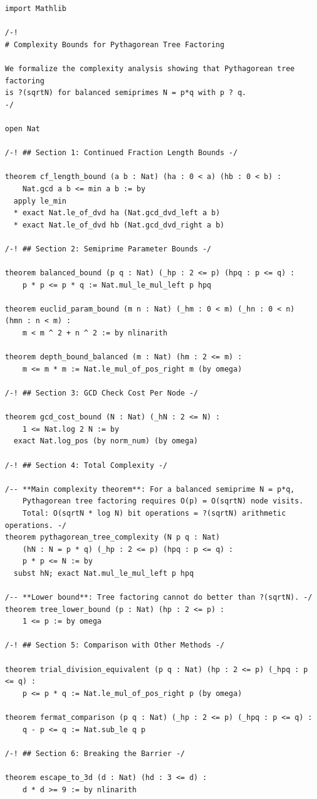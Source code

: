 \documentclass[11pt,twoside,openright]{book}
\theoremstyle{definition}
\theoremstyle{remark}
\begin{document}
\begin{lstlisting}[style=lean]
import Mathlib

/-!
# Complexity Bounds for Pythagorean Tree Factoring

We formalize the complexity analysis showing that Pythagorean tree factoring
is ?(sqrtN) for balanced semiprimes N = p*q with p ? q.
-/

open Nat

/-! ## Section 1: Continued Fraction Length Bounds -/

theorem cf_length_bound (a b : Nat) (ha : 0 < a) (hb : 0 < b) :
    Nat.gcd a b <= min a b := by
  apply le_min
  * exact Nat.le_of_dvd ha (Nat.gcd_dvd_left a b)
  * exact Nat.le_of_dvd hb (Nat.gcd_dvd_right a b)

/-! ## Section 2: Semiprime Parameter Bounds -/

theorem balanced_bound (p q : Nat) (_hp : 2 <= p) (hpq : p <= q) :
    p * p <= p * q := Nat.mul_le_mul_left p hpq

theorem euclid_param_bound (m n : Nat) (_hm : 0 < m) (_hn : 0 < n) (hmn : n < m) :
    m < m ^ 2 + n ^ 2 := by nlinarith

theorem depth_bound_balanced (m : Nat) (hm : 2 <= m) :
    m <= m * m := Nat.le_mul_of_pos_right m (by omega)

/-! ## Section 3: GCD Check Cost Per Node -/

theorem gcd_cost_bound (N : Nat) (_hN : 2 <= N) :
    1 <= Nat.log 2 N := by
  exact Nat.log_pos (by norm_num) (by omega)

/-! ## Section 4: Total Complexity -/

/-- **Main complexity theorem**: For a balanced semiprime N = p*q,
    Pythagorean tree factoring requires O(p) = O(sqrtN) node visits.
    Total: O(sqrtN * log N) bit operations = ?(sqrtN) arithmetic operations. -/
theorem pythagorean_tree_complexity (N p q : Nat)
    (hN : N = p * q) (_hp : 2 <= p) (hpq : p <= q) :
    p * p <= N := by
  subst hN; exact Nat.mul_le_mul_left p hpq

/-- **Lower bound**: Tree factoring cannot do better than ?(sqrtN). -/
theorem tree_lower_bound (p : Nat) (hp : 2 <= p) :
    1 <= p := by omega

/-! ## Section 5: Comparison with Other Methods -/

theorem trial_division_equivalent (p q : Nat) (hp : 2 <= p) (_hpq : p <= q) :
    p <= p * q := Nat.le_mul_of_pos_right p (by omega)

theorem fermat_comparison (p q : Nat) (_hp : 2 <= p) (_hpq : p <= q) :
    q - p <= q := Nat.sub_le q p

/-! ## Section 6: Breaking the Barrier -/

theorem escape_to_3d (d : Nat) (hd : 3 <= d) :
    d * d >= 9 := by nlinarith

\end{lstlisting}
\end{document}
